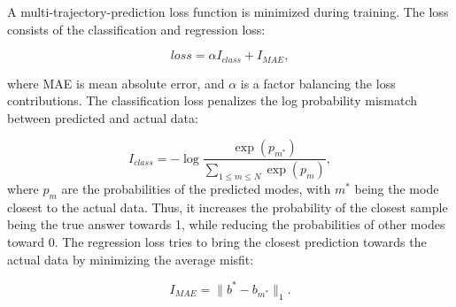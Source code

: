 
A multi-trajectory-prediction loss function is minimized during training. The loss consists of the classification and regression loss:

\begin{equation}
    loss = \alpha I_{class} + I_{MAE},
\end{equation}

where  MAE is mean absolute error, and $\alpha$ is a factor balancing the loss contributions. The classification loss penalizes the log probability mismatch between predicted and actual data:

\begin{equation}
    I_{class} = -\log 
    \frac{\exp (p_{m^*})}
    {\sum\limits_{1 \leq m \leq N}\exp (p_{m})},
\end{equation}
where $p_m$ are the probabilities of the predicted modes, with $m^*$ being the mode closest to the actual data.
Thus, it increases the probability of the closest sample being the true answer towards 1, while reducing the probabilities of other modes toward 0.
The regression loss tries to bring the closest prediction towards the actual data by minimizing the average misfit:

\begin{equation}
    I_{MAE} = \lVert b^* - b_{m^*} \rVert_1.
\end{equation}
